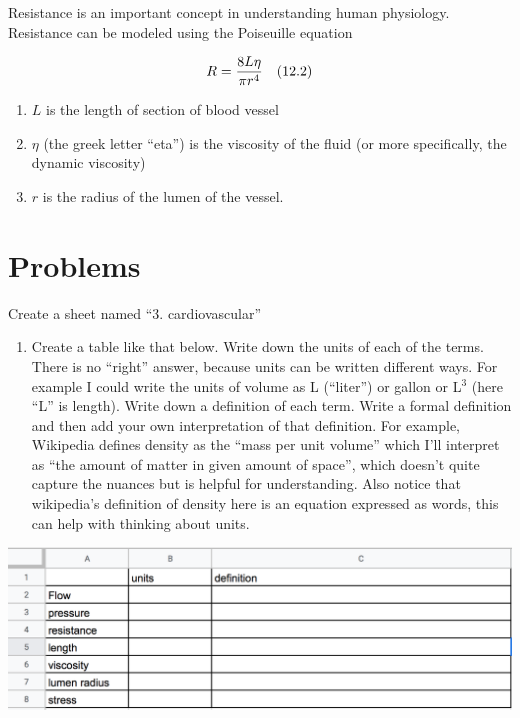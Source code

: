 \documentclass[]{book}
\providecommand{\tightlist}{%
  \setlength{\itemsep}{0pt}\setlength{\parskip}{0pt}}
\begin{document}
Resistance is an important concept in understanding human physiology.
Resistance can be modeled using the Poiseuille equation

\begin{equation}
R = \frac{8L\eta}{\pi r^4} \quad \small{(12.2)}
\end{equation}

\begin{enumerate}
\def\labelenumi{\arabic{enumi}.}
\tightlist
\item
  \(L\) is the length of section of blood vessel
\item
  \(\eta\) (the greek letter ``eta'') is the viscosity of the fluid (or
  more specifically, the dynamic viscosity)
\item
  \(r\) is the radius of the lumen of the vessel.
\end{enumerate}

\section{Problems}\label{problems-1}

Create a sheet named ``3. cardiovascular''

\begin{enumerate}
\def\labelenumi{\arabic{enumi}.}
\tightlist
\item
  Create a table like that below. Write down the units of each of the
  terms. There is no ``right'' answer, because units can be written
  different ways. For example I could write the units of volume as L
  (``liter'') or gallon or L\(^3\) (here ``L'' is length). Write down a
  definition of each term. Write a formal definition and then add your
  own interpretation of that definition. For example, Wikipedia defines
  density as the ``mass per unit volume'' which I'll interpret as ``the
  amount of matter in given amount of space'', which doesn't quite
  capture the nuances but is helpful for understanding. Also notice that
  wikipedia's definition of density here is an equation expressed as
  words, this can help with thinking about units.
\end{enumerate}

\includegraphics{images/flow_table.png}
\end{document}

